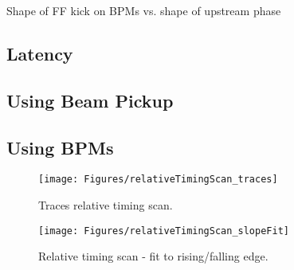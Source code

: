 Shape of FF kick on BPMs vs. shape of upstream phase


\subsection{Latency}
\label{ss:measLatency}

\subsection{Using Beam Pickup}
\label{ss:beamPickup}

\subsection{Using BPMs}
\label{ss:relativeBPM}


\begin{figure}
  \centering
  \texttt{[image: Figures/relativeTimingScan\_traces]}
  \caption{Traces relative timing scan.}
  \label{f:relativeTimingScan_traces}
\end{figure}

\begin{figure}
  \centering
  \texttt{[image: Figures/relativeTimingScan\_slopeFit]}
  \caption{Relative timing scan - fit to rising/falling edge.}
  \label{f:relativeTimingScan_slopeFit}
\end{figure}








